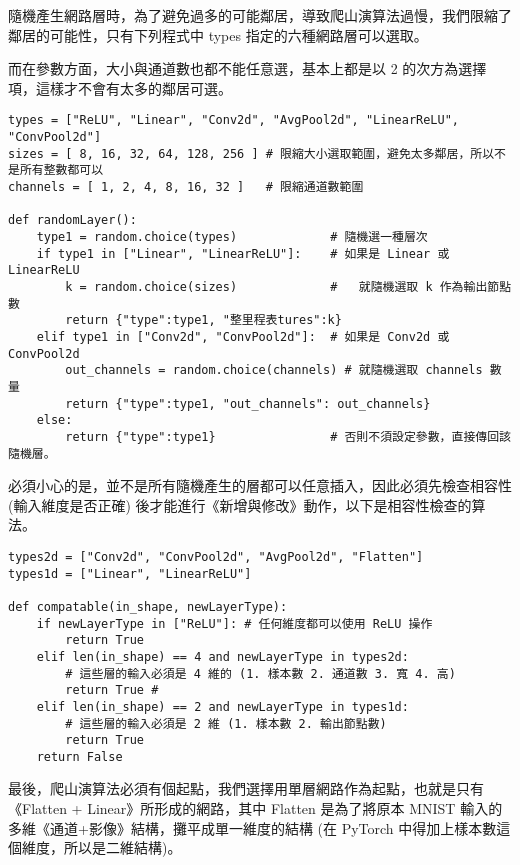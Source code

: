 \documentclass{article}
\begin{document}
隨機產生網路層時，為了避免過多的可能鄰居，導致爬山演算法過慢，我們限縮了鄰居的可能性，只有下列程式中 types 指定的六種網路層可以選取。

而在參數方面，大小與通道數也都不能任意選，基本上都是以 2 的次方為選擇項，這樣才不會有太多的鄰居可選。

\begin{minipage}{\linewidth}
\begin{lstlisting}
types = ["ReLU", "Linear", "Conv2d", "AvgPool2d", "LinearReLU", "ConvPool2d"]
sizes = [ 8, 16, 32, 64, 128, 256 ] # 限縮大小選取範圍，避免太多鄰居，所以不是所有整數都可以
channels = [ 1, 2, 4, 8, 16, 32 ]   # 限縮通道數範圍

def randomLayer():
    type1 = random.choice(types)             # 隨機選一種層次
    if type1 in ["Linear", "LinearReLU"]:    # 如果是 Linear 或 LinearReLU
        k = random.choice(sizes)             #   就隨機選取 k 作為輸出節點數
        return {"type":type1, "整里程表tures":k}
    elif type1 in ["Conv2d", "ConvPool2d"]:  # 如果是 Conv2d 或 ConvPool2d
        out_channels = random.choice(channels) # 就隨機選取 channels 數量
        return {"type":type1, "out_channels": out_channels}
    else:                                    
        return {"type":type1}                # 否則不須設定參數，直接傳回該隨機層。
\end{lstlisting}
\end{minipage}

必須小心的是，並不是所有隨機產生的層都可以任意插入，因此必須先檢查相容性 (輸入維度是否正確) 後才能進行《新增與修改》動作，以下是相容性檢查的算法。

\begin{minipage}{\linewidth}
\begin{lstlisting}
types2d = ["Conv2d", "ConvPool2d", "AvgPool2d", "Flatten"]
types1d = ["Linear", "LinearReLU"]

def compatable(in_shape, newLayerType):
    if newLayerType in ["ReLU"]: # 任何維度都可以使用 ReLU 操作
        return True
    elif len(in_shape) == 4 and newLayerType in types2d:
        # 這些層的輸入必須是 4 維的 (1. 樣本數 2. 通道數 3. 寬 4. 高)
        return True # 
    elif len(in_shape) == 2 and newLayerType in types1d:
        # 這些層的輸入必須是 2 維 (1. 樣本數 2. 輸出節點數)
        return True
    return False
\end{lstlisting}
\end{minipage}

最後，爬山演算法必須有個起點，我們選擇用單層網路作為起點，也就是只有《Flatten + Linear》所形成的網路，其中 Flatten 是為了將原本 MNIST 輸入的多維《通道+影像》結構，攤平成單一維度的結構 (在 PyTorch 中得加上樣本數這個維度，所以是二維結構)。
\end{document}
